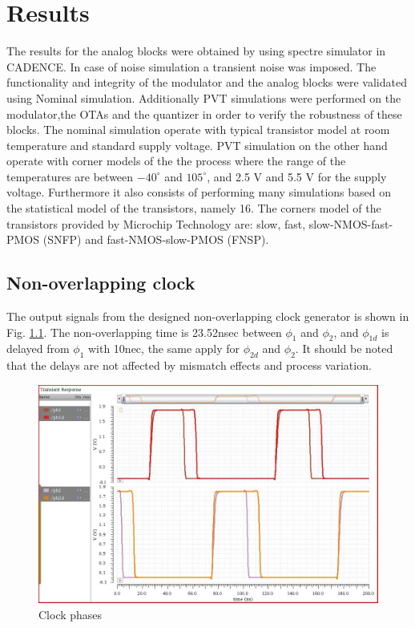\chapter{Results}\label{res:results}

The results for the analog blocks were obtained by using spectre simulator in CADENCE. In case of noise simulation a transient noise was imposed. The functionality and integrity of the modulator and the analog blocks were validated using Nominal simulation. Additionally PVT simulations were performed on the modulator,the OTAs and the quantizer in order to verify the robustness of these blocks. The nominal simulation operate with typical transistor model at room temperature and standard supply voltage. PVT simulation on the other hand operate with corner models of the the process where the range of the temperatures are between $-40^\circ$ and $105^\circ$, and 2.5 V and 5.5 V for the supply voltage. Furthermore it also consists of performing many simulations based on the statistical model of the transistors, namely 16. The corners model of the transistors provided by Microchip Technology are: slow, fast, slow-NMOS-fast-PMOS (SNFP) and fast-NMOS-slow-PMOS (FNSP). 


\section{Non-overlapping clock}
The output signals from the designed non-overlapping clock generator is shown in Fig. \ref{clock_out}. The non-overlapping time is 23.52nsec between $\phi_1$ and $\phi_2$, and $\phi_{1d}$ is delayed from $\phi_1$ with 10nec, the same apply for $\phi_{2d}$ and $\phi_2$. It should be noted that the delays are not affected by mismatch effects and process variation. 

\begin{figure}[h]
\centering
\includegraphics[width=\textwidth]{images/two_phase_clock_out.jpg}
\caption{Clock phases}
\label{clock_out}
\end{figure}


